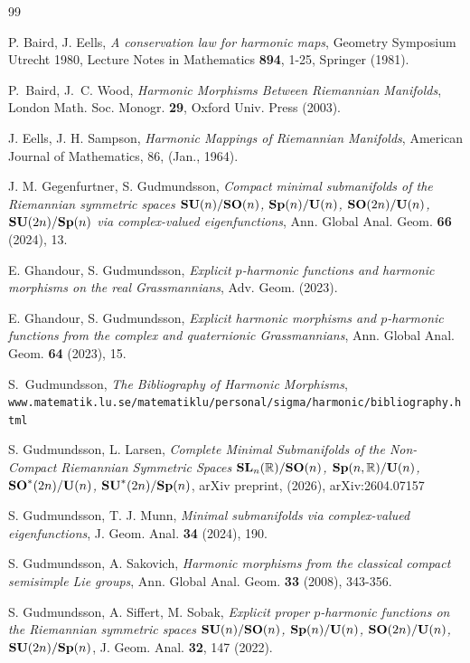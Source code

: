 \documentclass[11pt,reqno]{amsart}
\theoremstyle{plain}
\theoremstyle{definition}
\numberwithin{equation}{section}
\def \rn{{\mathbb R}}
\def \SLR#1{\text{\bf SL}_{#1}(\rn)}
\def \SO#1{\text{\bf SO}(#1)}
\def \SOs#1{\text{\bf SO}^*(#1)}
\def \SUs#1{\text{\bf SU}^*(#1)}
\def \U#1{\text{\bf U}(#1)}
\def \SU#1{\text{\bf SU}(#1)}
\def \Sp#1{\text{\bf Sp}(#1)}
\def \SpR#1{\text{\bf Sp}(#1,\rn)}
\numberwithin{equation}{section}
\begin{document}
\begin{thebibliography}{99}
	
P. Baird, J. Eells,
{\it A conservation law for harmonic maps},
Geometry Symposium Utrecht 1980, Lecture Notes in Mathematics {\bf 894}, 1-25, Springer (1981).

P.~Baird, J.~C. Wood,
{\it Harmonic Morphisms Between Riemannian Manifolds},
London Math. Soc. Monogr. {\bf 29},
Oxford Univ. Press (2003).	

J. Eells, J. H. Sampson,
{\it Harmonic Mappings of Riemannian Manifolds},
American Journal of Mathematics, 86, (Jan., 1964).





J. M. Gegenfurtner, S. Gudmundsson,
{\it Compact minimal submanifolds of the Riemannian symmetric spaces $\SU n/\SO n$, $\Sp n/\U n$, $\SO{2n}/\U n$, $\SU{2n}/\Sp n$ via complex-valued eigenfunctions},  
Ann. Global Anal. Geom. {\bf 66} (2024), 13.

E. Ghandour, S. Gudmundsson,
{\it Explicit $p$-harmonic functions and harmonic morphisms on the real Grassmannians}, 
Adv. Geom. (2023).

E. Ghandour, S. Gudmundsson,
{\it Explicit harmonic morphisms and $p$-harmonic functions from the complex and quaternionic Grassmannians}, 
Ann. Global Anal. Geom. {\bf 64} (2023), 15.

S.~Gudmundsson,
{\it The Bibliography of Harmonic Morphisms},
{\tt www.matematik.lu.se/matematiklu/personal/sigma/harmonic/bibliography.html}


S. Gudmundsson, L. Larsen,
{\it Complete Minimal Submanifolds of the Non-Compact Riemannian Symmetric Spaces $\SLR n/\SO n$, $\SpR{n}/\U n$, $\SOs{2n}/\U n$, $\SUs{2n}/\Sp n$},
arXiv preprint, (2026), arXiv:2604.07157

S. Gudmundsson, T. J. Munn,
{\it Minimal submanifolds via complex-valued eigenfunctions},
J. Geom. Anal. {\bf 34} (2024), 190.


S. Gudmundsson, A. Sakovich,
{\it Harmonic morphisms from the classical compact semisimple Lie groups},
Ann. Global Anal. Geom. {\bf 33} (2008), 343-356.

S. Gudmundsson, A. Siffert, M. Sobak,
{\it Explicit proper $p$-harmonic functions on the Riemannian symmetric spaces $\SU n/\SO n$, $\Sp n/\U n$, $\SO {2n}/\U n$, $\SU{2n}/\Sp n$},
J. Geom. Anal. {\bf 32}, 147 (2022).


\end{thebibliography}
\end{document}
